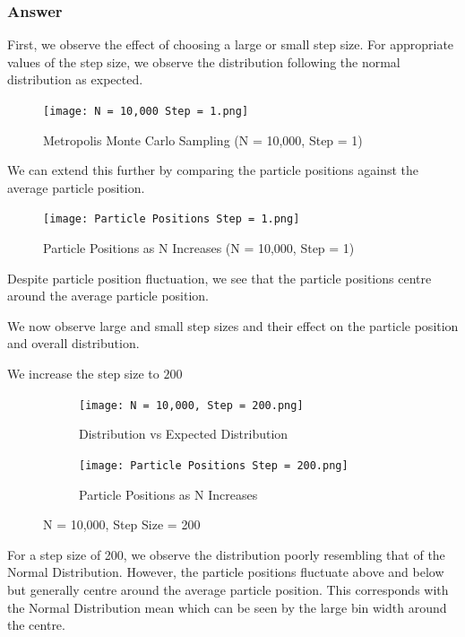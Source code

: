 \documentclass[12pt]{article}
\begin{document}
\subsubsection*{Answer}

First, we observe the effect of choosing a large or small step size. For appropriate values of the step size, we observe the distribution following the normal distribution as expected.

\begin{figure}[h!]
  \texttt{[image: N = 10,000 Step = 1.png]}
  \caption{Metropolis Monte Carlo Sampling (N = 10,000, Step = 1)}
  \label{fig:mc_randomness}
\end{figure}

We can extend this further by comparing the particle positions against the average particle position. 

\begin{figure}[h!]
  \texttt{[image: Particle Positions Step = 1.png]}
  \caption{Particle Positions as N Increases (N = 10,000, Step = 1)}
  \label{fig:mc_randomness}
\end{figure}

Despite particle position fluctuation, we see that the particle positions centre around the average particle position.

We now observe large and small step sizes and their effect on the particle position and overall distribution.

We increase the step size to $200$ 

\begin{figure}[h]
\begin{subfigure}{0.5\textwidth}
\texttt{[image: N = 10,000, Step = 200.png]} 
\caption{Distribution vs Expected Distribution}
\label{fig:subim1}
\end{subfigure}
\begin{subfigure}{0.5\textwidth}
\texttt{[image: Particle Positions Step = 200.png]}
\caption{Particle Positions as N Increases}
\label{fig:subim2}
\end{subfigure}
\caption{N = 10,000, Step Size = 200}
\label{fig:image2}
\end{figure}

For a step size of 200, we observe the distribution poorly resembling that of the Normal Distribution. However, the particle positions fluctuate above and below but generally centre around the average particle position. This corresponds with the Normal Distribution mean which can be seen by the large bin width around the centre. 
\end{document}
